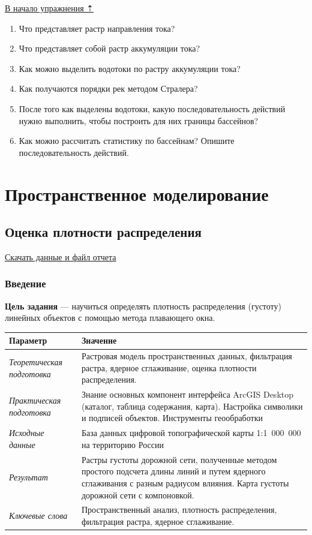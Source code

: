 \documentclass[12pt,]{book}
\begin{document}
\protect\hyperlink{dem}{В начало упражнения ⇡}

\begin{enumerate}
\def\labelenumi{\arabic{enumi}.}
\item
  Что представляет растр направления тока?
\item
  Что представляет собой растр аккумуляции тока?
\item
  Как можно выделить водотоки по растру аккумуляции тока?
\item
  Как получаются порядки рек методом Стралера?
\item
  После того как выделены водотоки, какую последовательность действий нужно выполнить, чтобы построить для них границы бассейнов?
\item
  Как можно рассчитать статистику по бассейнам? Опишите последовательность действий.
\end{enumerate}

\hypertarget{part---3}{%
\part{Пространственное моделирование}\label{part---3}}

\hypertarget{density-analysis}{%
\chapter{Оценка плотности распределения}\label{density-analysis}}

\href{http://autolab.geogr.msu.ru/gis/data/Ex16.zip}{Скачать данные и файл отчета}

\hypertarget{density-analysis-intro}{%
\section{Введение}\label{density-analysis-intro}}

\textbf{Цель задания} --- научиться определять плотность распределения (густоту) линейных объектов с помощью метода плавающего окна.

\begin{longtable}[]{@{}ll@{}}
\toprule
Параметр & Значение\tabularnewline
\midrule
\endhead
\emph{Теоретическая подготовка} & Растровая модель пространственных данных, фильтрация растра, ядерное сглаживание, оценка плотности распределения.\tabularnewline
\emph{Практическая подготовка} & Знание основных компонент интерфейса ArcGIS Desktop (каталог, таблица содержания, карта). Настройка символики и подписей объектов. Инструменты геообработки\tabularnewline
\emph{Исходные данные} & База данных цифровой топографической карты 1:1~000~000 на территорию России\tabularnewline
\emph{Результат} & Растры густоты дорожной сети, полученные методом простого подсчета длины линий и путем ядерного сглаживания с разным радиусом влияния. Карта густоты дорожной сети с компоновкой.\tabularnewline
\emph{Ключевые слова} & Пространственный анализ, плотность распределения, фильтрация растра, ядерное сглаживание.\tabularnewline
\bottomrule
\end{longtable}
\end{document}
